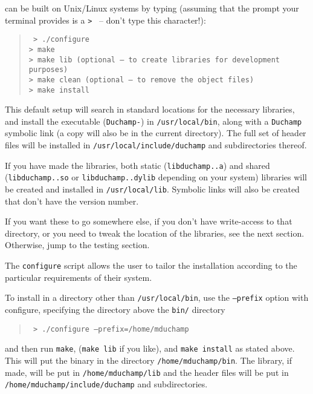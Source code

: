 
\duchamp can be built on Unix/Linux systems by typing (assuming that
the prompt your terminal provides is a \texttt{> } -- don't type this
character!):
\begin{quote}
{\footnotesize
\texttt{%
> ./configure\\
> make\\
> make lib (optional -- to create libraries for development
purposes)\\ 
> make clean (optional -- to remove the object files)\\
> make install }
}
\end{quote}

This default setup will search in standard locations for the necessary
libraries, and install the executable (\texttt{Duchamp-\version}) in
\texttt{/usr/local/bin}, along with a \texttt{Duchamp} symbolic link
(a copy will also be in the current directory). The full set of header
files will be installed in \texttt{/usr/local/include/duchamp} and
subdirectories thereof. 

If you have made the libraries, both static
(\texttt{libduchamp.\version.a}) and shared
(\texttt{libduchamp.\version.so} or \texttt{libduchamp.\version.dylib}
depending on your system) libraries will be created and installed in
\texttt{/usr/local/lib}. Symbolic links will also be created that
don't have the version number.

If you want these to go somewhere else, \eg if you don't have
write-access to that directory, or you need to tweak the location of
the libraries, see the next section. Otherwise, jump to the testing
section.


The \texttt{configure} script allows the user to tailor the
installation according to the particular requirements of their
system. 

To install \duchamp in a directory other than \texttt{/usr/local/bin},
use the \texttt{--prefix} option with configure, specifying the
directory above the \texttt{bin/} directory \eg
\begin{quote}
{\footnotesize
\texttt{%
> ./configure --prefix=/home/mduchamp}
}
\end{quote}
and then run \texttt{make}, (\texttt{make lib} if you like), and
\texttt{make install} as stated above. This will put the binary in the
directory \texttt{/home/mduchamp/bin}. The library, if made, will be
put in \texttt{/home/mduchamp/lib} and the header files will be put in
\texttt{/home/mduchamp/include/duchamp} and subdirectories.

